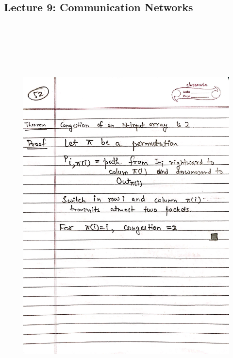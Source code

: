 \newpage
{\color{black} \subsection*{Lecture 9: Communication Networks}}
\begin{figure}[H]
    \centering
    \includegraphics[width=16cm, height=21cm]{"./MIT-6.042J/MIT-6042J-052"}
\end{figure}

